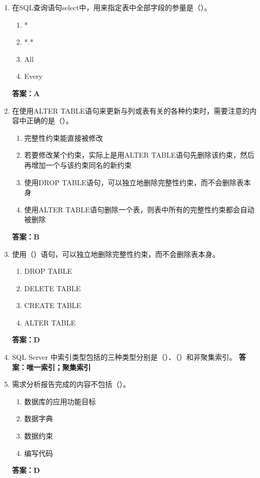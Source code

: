 \documentclass[12pt, a4paper]{article}
\begin{document}
\begin{enumerate}[label=\arabic*.]
	\item 在SQL查询语句select中，用来指定表中全部字段的参量是（\quad）。
	      \begin{enumerate}
		      \item *
		      \item *.*
		      \item All
		      \item Every
	      \end{enumerate}
	      \textbf{答案：A}

	\item 在使用ALTER TABLE语句来更新与列或表有关的各种约束时，需要注意的内容中正确的是（\quad）。
	      \begin{enumerate}
		      \item 完整性约束能直接被修改
		      \item 若要修改某个约束，实际上是用ALTER TABLE语句先删除该约束，然后再增加一个与该约束同名的新约束
		      \item 使用DROP TABLE语句，可以独立地删除完整性约束，而不会删除表本身
		      \item 使用ALTER TABLE语句删除一个表，则表中所有的完整性约束都会自动被删除
	      \end{enumerate}
	      \textbf{答案：B}

	\item 使用（\quad）语句，可以独立地删除完整性约束，而不会删除表本身。
	      \begin{enumerate}
		      \item DROP TABLE
		      \item DELETE TABLE
		      \item CREATE TABLE
		      \item ALTER TABLE
	      \end{enumerate}
	      \textbf{答案：D}

	\item SQL Server 中索引类型包括的三种类型分别是（\quad）、（\quad）和非聚集索引。
	      \textbf{答案：唯一索引；聚集索引}

	\item 需求分析报告完成的内容不包括（\quad）。
	      \begin{enumerate}
		      \item 数据库的应用功能目标
		      \item 数据字典
		      \item 数据约束
		      \item 编写代码
	      \end{enumerate}
	      \textbf{答案：D}


\end{enumerate}
\end{document}
